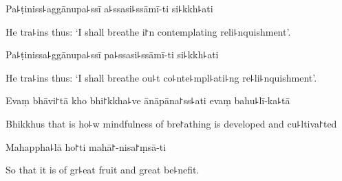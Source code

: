 Pa꜕ṭiniss꜕aggānupa꜕ssī a꜕ssasi꜕ssāmī-ti si꜕kkh꜕ati

\begin{english}
  He tra꜕ins thus: `I shall breathe i꜓n contemplating reli꜕nquishment'.
\end{english}

Pa꜕ṭinissa꜕ggānupa꜕ssī pa꜕ssasi꜕ssāmī-ti si꜕kkh꜕ati

\begin{english}
  He tra꜕ins thus: `I shall breathe ou꜕t co꜕nte꜕mpl꜕ati꜕ng re꜕li꜕nquishment'.
\end{english}

Evaṃ bhāvi꜓tā kho bhi꜓kkha꜕ve ānāpāna꜓ss꜕ati evaṃ bahu꜕lī-ka꜕tā


\begin{english}
  Bhikkhus that is ho꜕w mindfulness of bre꜓athing is developed and cu꜕ltiva꜓ted
\end{english}

Mahappha꜕lā ho꜓ti mahā꜓-nisa꜓ṃsā-ti

\begin{english}
  So that it is of gr꜕eat fruit and great be꜕nefit.
\end{english}


